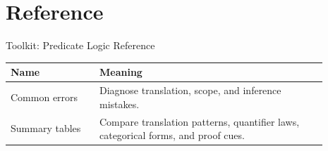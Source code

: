 \section{Reference}

\begin{toolkitbox}{Toolkit: Predicate Logic Reference}
\small
\begin{tabular}{p{0.25\linewidth} p{0.64\linewidth}}
\toprule
\textbf{Name} & \textbf{Meaning} \\
\midrule
Common errors & Diagnose translation, scope, and inference mistakes. \\
Summary tables & Compare translation patterns, quantifier laws, categorical forms, and proof cues. \\
\bottomrule
\end{tabular}
\end{toolkitbox}





